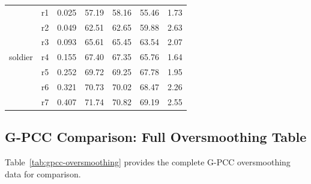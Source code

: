 \begin{table}[t]
\begin{tabular}{llrrrrr}
    \midrule
    \multirow{7}{*}{soldier}
      & r1 & 0.025 & 57.19 & 58.16 & 55.46 & 1.73 \\
      & r2 & 0.049 & 62.51 & 62.65 & 59.88 & 2.63 \\
      & r3 & 0.093 & 65.61 & 65.45 & 63.54 & 2.07 \\
      & r4 & 0.155 & 67.40 & 67.35 & 65.76 & 1.64 \\
      & r5 & 0.252 & 69.72 & 69.25 & 67.78 & 1.95 \\
      & r6 & 0.321 & 70.73 & 70.02 & 68.47 & 2.26 \\
      & r7 & 0.407 & 71.74 & 70.82 & 69.19 & 2.55 \\
    \bottomrule
  \end{tabular}
\end{table}

\subsection{G-PCC Comparison: Full Oversmoothing Table}

Table~\ref{tab:gpcc-oversmoothing} provides the complete G-PCC oversmoothing
data for comparison.

